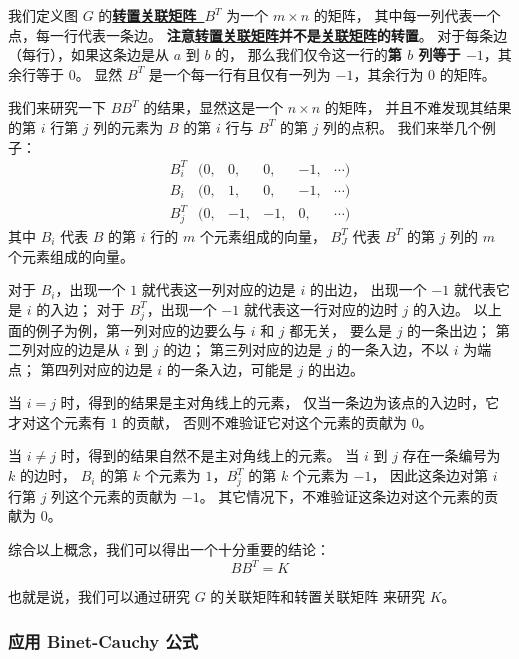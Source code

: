 \documentclass[UTF8]{article}
\begin{document}
	我们定义图 $G$ 的\textbf{\uline{转置关联矩阵~$B^T$}} 为一个 $m \times n$ 的矩阵，
	其中每一列代表一个点，每一行代表一条边。
	\textbf{注意\uline{转置关联矩阵}并不是\uline{关联矩阵}的转置}。
	对于每条边（每行），如果这条边是从 $a$ 到 $b$ 的，
	那么我们仅令这一行的\textbf{第 $b$ 列等于 $-1$}，其余行等于 $0$。
	显然 $B^T$ 是一个每一行有且仅有一列为 $-1$，其余行为 $0$ 的矩阵。

	我们来研究一下 $B B^T$ 的结果，显然这是一个 $n \times n$ 的矩阵，
	并且不难发现其结果的第 $i$ 行第 $j$ 列的元素为
	$B$ 的第 $i$ 行与 $B^T$ 的第 $j$ 列的点积。
	我们来举几个例子：
	\begin{equation*}
		\begin{matrix}
			B^T_i& (0,& 0,& 0,& -1,& \cdots)
			\\
			B_i& (0,& 1,& 0,& -1,& \cdots)
			\\
			B^T_j& (0,& -1,& -1,& 0,& \cdots)
		\end{matrix}
	\end{equation*}
	其中 $B_i$ 代表 $B$ 的第 $i$ 行的 $m$ 个元素组成的向量，
	$B^T_J$ 代表 $B^T$ 的第 $j$ 列的 $m$ 个元素组成的向量。

	对于 $B_i$，出现一个 $1$ 就代表这一列对应的边是 $i$ 的出边，
	出现一个 $-1$ 就代表它是 $i$ 的入边；
	对于 $B^T_j$，出现一个 $-1$ 就代表这一行对应的边时 $j$ 的入边。
	以上面的例子为例，第一列对应的边要么与 $i$ 和 $j$ 都无关，
	要么是 $j$ 的一条出边；
	第二列对应的边是从 $i$ 到 $j$ 的边；
	第三列对应的边是 $j$ 的一条入边，不以 $i$ 为端点；
	第四列对应的边是 $i$ 的一条入边，可能是 $j$ 的出边。

	当 $i = j$ 时，得到的结果是主对角线上的元素，
	仅当一条边为该点的入边时，它才对这个元素有 $1$ 的贡献，
	否则不难验证它对这个元素的贡献为 $0$。

	当 $i \ne j$ 时，得到的结果自然不是主对角线上的元素。
	当 $i$ 到 $j$ 存在一条编号为 $k$ 的边时，
	$B_i$ 的第 $k$ 个元素为 $1$，$B^T_j$ 的第 $k$ 个元素为 $-1$，
	因此这条边对第 $i$ 行第 $j$ 列这个元素的贡献为 $-1$。
	其它情况下，不难验证这条边对这个元素的贡献为 $0$。

	\bigskip

	综合以上概念，我们可以得出一个十分重要的结论：
	$$
	B B^T = K
	$$

	也就是说，我们可以通过研究 $G$ 的关联矩阵和转置关联矩阵
	来研究 $K$。

	\subsubsection{应用 Binet-Cauchy 公式}
\end{document}
